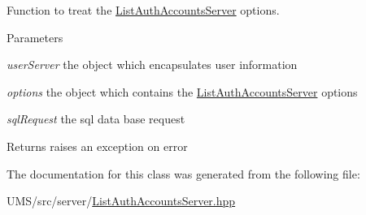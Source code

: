 Function to treat the \hyperlink{classListAuthAccountsServer}{ListAuthAccountsServer} options. 


\begin{DoxyParams}{Parameters}
\item[{\em userServer}]the object which encapsulates user information \item[{\em options}]the object which contains the \hyperlink{classListAuthAccountsServer}{ListAuthAccountsServer} options \item[{\em sqlRequest}]the sql data base request \end{DoxyParams}
\begin{DoxyReturn}{Returns}
raises an exception on error 
\end{DoxyReturn}


The documentation for this class was generated from the following file:\begin{DoxyCompactItemize}
\item 
UMS/src/server/\hyperlink{ListAuthAccountsServer_8hpp}{ListAuthAccountsServer.hpp}\end{DoxyCompactItemize}
